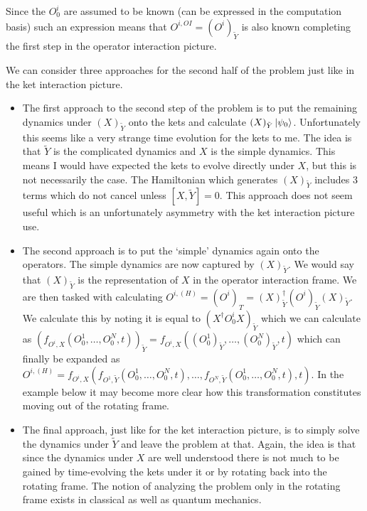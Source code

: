 \documentclass[12pt]{article}
\begin{document}
Since the $O^i_0$ are assumed to be known (can be expressed in the computation basis) such an expression means that $O^{i, OI} = \left(O^i\right)_{\tilde{Y}}$ is also known completing the first step in the operator interaction picture.

We can consider three approaches for the second half of the problem just like in the ket interaction picture.

\begin{itemize}
\item{The first approach to the second step of the problem is to put the remaining dynamics under $\left(X\right)_{\tilde{Y}}$ onto the kets and calculate $(X)_{\tilde{Y}}\ket{\psi_0}$. Unfortunately this seems like a very strange time evolution for the kets to me. The idea is that $\tilde{Y}$ is the complicated dynamics and $X$ is the simple dynamics. This means I would have expected the kets to evolve directly under $X$, but this is not necessarily the case. The Hamiltonian which generates $(X)_{\tilde{Y}}$ includes 3 terms which do not cancel unless $[X, \tilde{Y}]=0$.  This approach does not seem useful which is an unfortunately asymmetry with the ket interaction picture use.}
\item{The second approach is to put the `simple' dynamics again onto the operators. The simple dynamics are now captured by $(X)_{\tilde{Y}}$. We would say that $(X)_{\tilde{Y}}$ is the representation of $X$ in the operator interaction frame. We are then tasked with calculating $O^{i,(H)} = \left(O^i\right)_T = (X)_{\tilde{Y}}^{\dag}\left(O^i\right)_{\tilde{Y}}(X)_{\tilde{Y}}$. We calculate this by noting it is equal to $\left(X^{\dag}O^i_0X\right)_{\tilde{Y}}$ which we can calculate as $\left(f_{O^i,X}\left(O^1_0,\ldots,O^N_0,t\right)\right)_{\tilde{Y}} = f_{O^i,X}\left(\left(O^1_0\right)_{\tilde{Y}},\ldots,\left(O^N_0\right)_{\tilde{Y}}, t\right)$ which can finally be expanded as \\$O^{i,(H)}= f_{O^i, X}\left(f_{O^1, \tilde{Y}}\left(O^1_0, \ldots, O^N_0, t\right),\ldots ,f_{O^N,\tilde{Y}}\left(O^1_0, \ldots, O^N_0, t\right), t\right)$. In the example below it may become more clear how this transformation constitutes moving out of the rotating frame.}
\item{The final approach, just like for the ket interaction picture, is to simply solve the dynamics under $\tilde{Y}$ and leave the problem at that. Again, the idea is that since the dynamics under $X$ are well understood there is not much to be gained by time-evolving the kets under it or by rotating back into the rotating frame. The notion of analyzing the problem only in the rotating frame exists in classical as well as quantum mechanics.}
\end{itemize}
\end{document}

